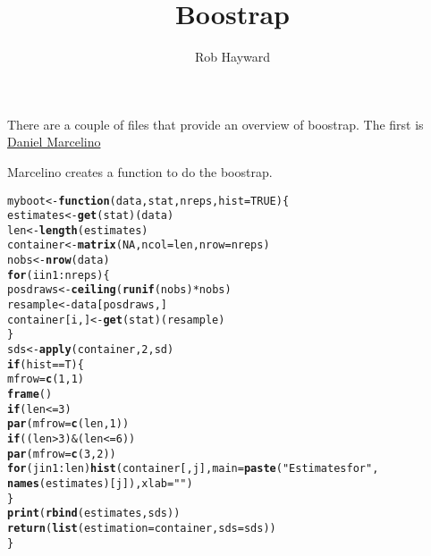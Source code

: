 \documentclass{article}\usepackage{graphicx, color}
\title{Boostrap}
\author{Rob Hayward}
\makeatletter
\newcommand{\hlfunctioncall}[1]{\textcolor[rgb]{0.501960784313725,0,0.329411764705882}{\textbf{#1}}}%
\newcommand{\hlstring}[1]{\textcolor[rgb]{0.6,0.6,1}{#1}}%
\newenvironment{kframe}{%
 \def\at@end@of@kframe{}%
 \ifinner\ifhmode%
  \def\at@end@of@kframe{\end{minipage}}%
  \begin{minipage}{\columnwidth}%
 \fi\fi%
 \def\FrameCommand##1{\hskip\@totalleftmargin \hskip-\fboxsep
 \colorbox{shadecolor}{##1}\hskip-\fboxsep
     \hskip-\linewidth \hskip-\@totalleftmargin \hskip\columnwidth}%
 \MakeFramed {\advance\hsize-\width
   \@totalleftmargin\z@ \linewidth\hsize
   \@setminipage}}%
 {\par\unskip\endMakeFramed%
 \at@end@of@kframe}
\newenvironment{knitrout}{}{} %
\makeatother
\begin{document}
\maketitle
There are a couple of files that provide an overview of boostrap. The first is  \href{http://danielmarcelino.com/got-bootstrap/}{Daniel Marcelino}

Marcelino creates a function to do the boostrap.  
\begin{knitrout}
\color{fgcolor}\begin{kframe}
\begin{alltt}
myboot <- \hlfunctioncall{function}(data, stat, nreps, hist = TRUE) \{
    estimates <- \hlfunctioncall{get}(stat)(data)
    len <- \hlfunctioncall{length}(estimates)
    container <- \hlfunctioncall{matrix}(NA, ncol = len, nrow = nreps)
    nobs <- \hlfunctioncall{nrow}(data)
    \hlfunctioncall{for} (i in 1:nreps) \{
        posdraws <- \hlfunctioncall{ceiling}(\hlfunctioncall{runif}(nobs) * nobs)
        resample <- data[posdraws, ]
        container[i, ] <- \hlfunctioncall{get}(stat)(resample)
    \}
    sds <- \hlfunctioncall{apply}(container, 2, sd)
    \hlfunctioncall{if} (hist == T) \{
        mfrow = \hlfunctioncall{c}(1, 1)
        \hlfunctioncall{frame}()
        \hlfunctioncall{if} (len <= 3) 
            \hlfunctioncall{par}(mfrow = \hlfunctioncall{c}(len, 1))
        \hlfunctioncall{if} ((len > 3) & (len <= 6)) 
            \hlfunctioncall{par}(mfrow = \hlfunctioncall{c}(3, 2))
        \hlfunctioncall{for} (j in 1:len) \hlfunctioncall{hist}(container[, j], main = \hlfunctioncall{paste}(\hlstring{"Estimates for "}, 
            \hlfunctioncall{names}(estimates)[j]), xlab = \hlstring{""})
    \}
    \hlfunctioncall{print}(\hlfunctioncall{rbind}(estimates, sds))
    \hlfunctioncall{return}(\hlfunctioncall{list}(estimation = container, sds = sds))
\}
\end{alltt}
\end{kframe}
\end{knitrout}
\end{document}
